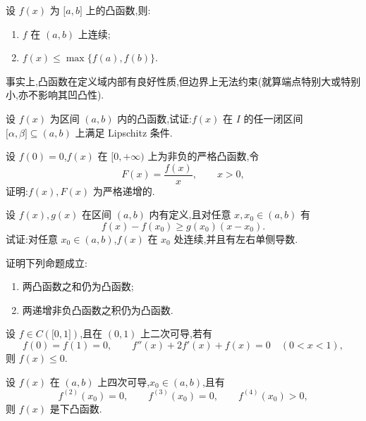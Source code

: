 \documentclass[../数学分析培优讲义.tex]{subfiles}
\begin{document}
\begin{theorem}[\markstar]
设 $f(x)$ 为 $\lbrack a,b\rbrack$ 上的凸函数,则:
\begin{enumerate}[label=(\arabic*)]
    \item $f$ 在 $(a,b)$ 上连续;
    \item $f(x)\leq\max\{f(a),f(b)\}$.
\end{enumerate}
\end{theorem}

\begin{remark}
事实上,凸函数在定义域内部有良好性质,但边界上无法约束(就算端点特别大或特别小,亦不影响其凹凸性).
\end{remark}

\begin{example}
设 $f(x)$ 为区间 $(a,b)$ 内的凸函数,试证:$f(x)$ 在 $I$ 的任一闭区间 $\lbrack \alpha,\beta\rbrack\subseteq(a,b)$ 上满足 Lipschitz 条件.
\end{example}
\exampleblank

\begin{example}
设 $f(0)=0$,$f(x)$ 在 $\lbrack 0,+\infty)$ 上为非负的严格凸函数,令
\[
    F(x)=\dfrac{f(x)}{x},\qquad x>0,
\]
证明:$f(x),F(x)$ 为严格递增的.
\end{example}
\exampleblank

\begin{example}
设 $f(x),g(x)$ 在区间 $(a,b)$ 内有定义,且对任意 $x,x_0\in(a,b)$ 有
\[
    f(x)-f(x_0)\geq g(x_0)(x-x_0).
\]
试证:对任意 $x_0\in(a,b)$,$f(x)$ 在 $x_0$ 处连续,并且有左右单侧导数.
\end{example}
\exampleblank

\begin{example}
证明下列命题成立:
\begin{enumerate}[label=(\arabic*)]
    \item 两凸函数之和仍为凸函数;
    \item 两递增非负凸函数之积仍为凸函数.
\end{enumerate}
\end{example}
\exampleblank

\begin{example}
设 $f\in C(\lbrack 0,1\rbrack)$,且在 $(0,1)$ 上二次可导,若有
\[
    f(0)=f(1)=0,
    \qquad f''(x)+2f'(x)+f(x)=0\quad(0<x<1),
\]
则 $f(x)\leq0$.
\end{example}
\exampleblank

\begin{example}
设 $f(x)$ 在 $(a,b)$ 上四次可导,$x_0\in(a,b)$,且有
\[
    f^{(2)}(x_0)=0,
    \qquad f^{(3)}(x_0)=0,
    \qquad f^{(4)}(x_0)>0,
\]
则 $f(x)$ 是下凸函数.
\end{example}
\exampleblank
\end{document}
